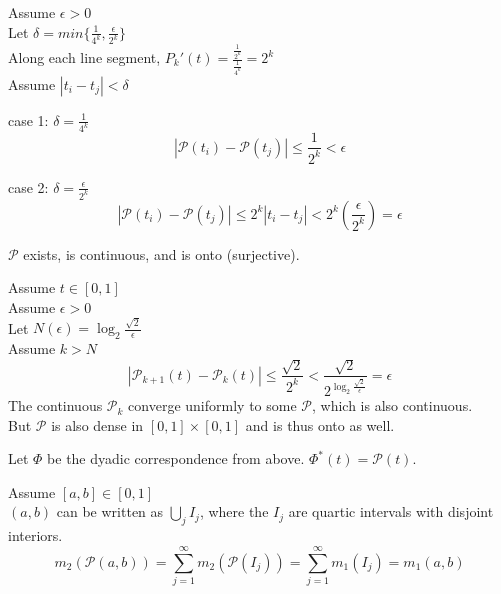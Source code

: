 \documentclass[letterpaper,12pt,fleqn]{article}
\newcommand{\uint}{[0,1]}
\newcommand{\usq}{\uint\times\uint}
\newcommand{\pc}{\mathcal{P}}
\begin{document}
\begin{theproof}
Assume $\epsilon>0$ \\
Let $\delta=min\{\frac{1}{4^k}, \frac{\epsilon}{2^k}\}$ \\
Along each line segment, $P_k'(t)=\frac{\frac{1}{2^k}}{\frac{1}{4^k}}=2^k$ \\
Assume $|t_i-t_j|<\delta$ \\
\begin{description}

\item{case 1: $\delta=\frac{1}{4^k}$}
\[|\pc(t_i)-\pc(t_j)|\le\frac{1}{2^k}<\epsilon\]

\item{case 2: $\delta=\frac{\epsilon}{2^k}$}
\[|\pc(t_i)-\pc(t_j)|\le2^k|t_i-t_j|<2^k(\frac{\epsilon}{2^k})=\epsilon\]

\end{description}
\end{theproof}

\begin{theorem}
$\pc$ exists, is continuous, and is onto (surjective).
\end{theorem}

\begin{theproof}
Assume $t\in\uint$ \\
Assume $\epsilon>0$ \\
Let $N(\epsilon)=\log_2\frac{\sqrt{2}}{\epsilon}$ \\
Assume $k>N$ \\
\[|\pc_{k+1}(t)-\pc_k(t)|\le\frac{\sqrt{2}}{2^k}<
    \frac{\sqrt{2}}{2^{\log_2\frac{\sqrt{2}}{\epsilon}}}=\epsilon\]
The continuous $\pc_k$ converge uniformly to some $\pc$, which is also
continuous. \\
But $\pc$ is also dense in $\usq$ and is thus onto as well.
\end{theproof}

\begin{theorem}
Let $\Phi$ be the dyadic correspondence from above. $\Phi^*(t)=\pc(t)$.
\end{theorem}

\begin{theproof}
Assume $[a,b]\in\uint$ \\
$(a,b)$ can be written as $\bigcup_jI_j$, where the $I_j$ are quartic intervals
with disjoint interiors. \\
\[m_2(\pc(a,b))=\sum_{j=1}^{\infty}m_2(\pc(I_j))=\sum_{j=1}^{\infty}m_1(I_j)=m_1(a,b)\]
\end{theproof}
\end{document}
